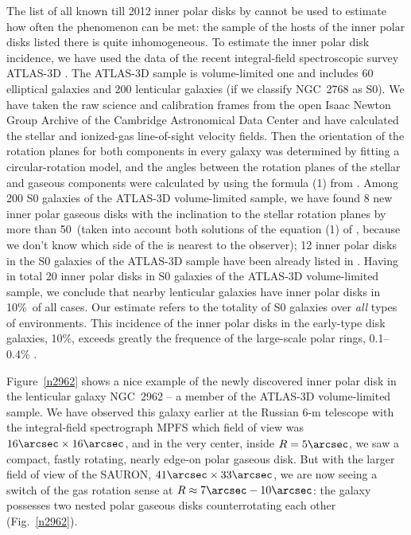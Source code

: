 \documentclass[11pt,twoside]{article}
\begin{document}
The list of all known till 2012 inner polar disks by \citet{mois_rev} cannot be used
to estimate how often the phenomenon can be met: the sample of the hosts of the inner
polar disks listed there is quite inhomogeneous. To estimate the inner polar disk
incidence, we have used the data of the recent integral-field spectroscopic survey
ATLAS-3D \citep{atlas3d_1}. The ATLAS-3D sample is volume-limited one and includes
60 elliptical galaxies and 200 lenticular galaxies (if we classify NGC~2768 as S0).
We have taken the raw science and calibration frames from the open Isaac Newton Group
Archive of the Cambridge Astronomical Data Center and have calculated the stellar
and ionized-gas line-of-sight velocity fields. Then the orientation of the rotation
planes for both components in every galaxy was determined by fitting a circular-rotation
model, and the angles between the rotation planes of the stellar and gaseous components
were calculated  by using the formula (1) from \citet{mois_rev}. Among 200 S0 galaxies
of the ATLAS-3D volume-limited sample, we have found 8 new inner polar gaseous disks
with the inclination to the stellar rotation planes by more than 50\deg\
(taken into account both solutions of the equation (1) of \citet{mois_rev}, 
because we don't know  which side of the  is nearest to the observer);
12 inner polar disks in the S0 galaxies of the ATLAS-3D sample have been already listed
in \citet{mois_rev}. Having in total 20 inner polar disks in S0 galaxies of the
ATLAS-3D volume-limited sample, we conclude that nearby lenticular galaxies have
inner polar disks in 10\%\ of all cases. Our estimate refers to the totality of S0 galaxies
over {\it all} types of environments. This incidence of the inner polar disks in
the early-type disk galaxies, 10\%, exceeds greatly the frequence of the large-scale
polar rings, 0.1--0.4\% \citep{resh11}.

Figure~\ref{n2962} shows a nice example of the newly discovered inner polar disk in
the lenticular galaxy NGC~2962 -- a member of the ATLAS-3D volume-limited sample. We have
observed this galaxy earlier  at the  Russian 6-m telescope with the integral-field spectrograph  MPFS which field of view was $16\arcsec \times 16\arcsec$, and in the very center, inside $R=5\arcsec$, we saw a compact, fastly rotating, nearly edge-on polar gaseous disk. But with the larger field
of view of the SAURON, $41\arcsec \times 33\arcsec$, we are now seeing a switch of the gas
rotation sense at $R\approx 7\arcsec -10\arcsec$: the galaxy possesses two nested
polar gaseous disks counterrotating each other (Fig.~\ref{n2962}).
\end{document}
